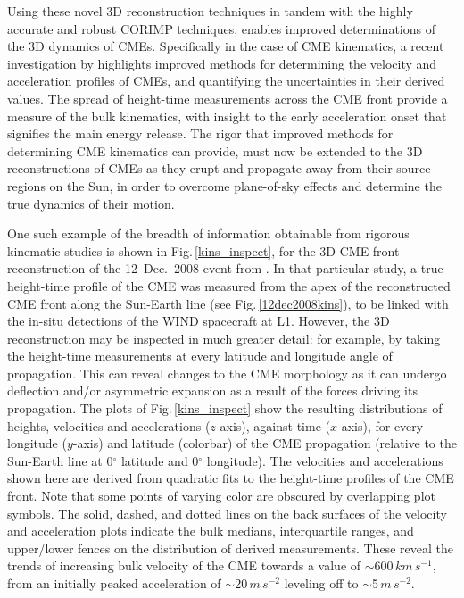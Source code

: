 \documentclass[preprint2]{aastex}
\begin{document}
Using these novel 3D reconstruction techniques in tandem with the highly accurate and robust CORIMP techniques, enables improved determinations of the 3D dynamics of CMEs. Specifically in the case of CME kinematics, a recent investigation by \citet{2013A&A...557A..96B} highlights improved methods for determining the velocity and acceleration profiles of CMEs, and quantifying the uncertainties in their derived values. The spread of height-time measurements across the CME front provide a measure of the bulk kinematics, with insight to the early acceleration onset that signifies the main energy release. The rigor that improved methods for determining CME kinematics can provide, must now be extended to the 3D reconstructions of CMEs as they erupt and propagate away from their source regions on the Sun, in order to overcome plane-of-sky effects and determine the true dynamics of their motion.

One such example of the breadth of information obtainable from rigorous kinematic studies is shown in Fig.\,\ref{kins_inspect}, for the 3D CME front reconstruction of the 12~Dec.~2008 event from \citealt{2010NatCo...1E..74B}. In that particular study, a true height-time profile of the CME was measured from the apex of the reconstructed CME front along the Sun-Earth line (see Fig.\,\ref{12dec2008kins}), to be linked with the in-situ detections of the WIND spacecraft at L1. However, the 3D reconstruction may be inspected in much greater detail: for example, by taking the height-time measurements at every latitude and longitude angle of propagation. This can reveal changes to the CME morphology as it can undergo deflection and/or asymmetric expansion as a result of the forces driving its propagation. The plots of Fig.\,\ref{kins_inspect} show the resulting distributions of heights, velocities and accelerations ($z$-axis), against time ($x$-axis), for every longitude ($y$-axis) and latitude (colorbar) of the CME propagation (relative to the Sun-Earth line at 0$^{\circ}$ latitude and 0$^{\circ}$ longitude). The velocities and accelerations shown here are derived from quadratic fits to the height-time profiles of the CME front. Note that some points of varying color are obscured by overlapping plot symbols. The solid, dashed, and dotted lines on the back surfaces of the velocity and acceleration plots indicate the bulk medians, interquartile ranges, and upper/lower fences on the distribution of derived measurements. These reveal the trends of increasing bulk velocity of the CME towards a value of $\sim$600$\,km\,s^{-1}$, from an initially peaked acceleration of $\sim$20$\,m\,s^{-2}$ leveling off to $\sim$5$\,m\,s^{-2}$.
\end{document}
